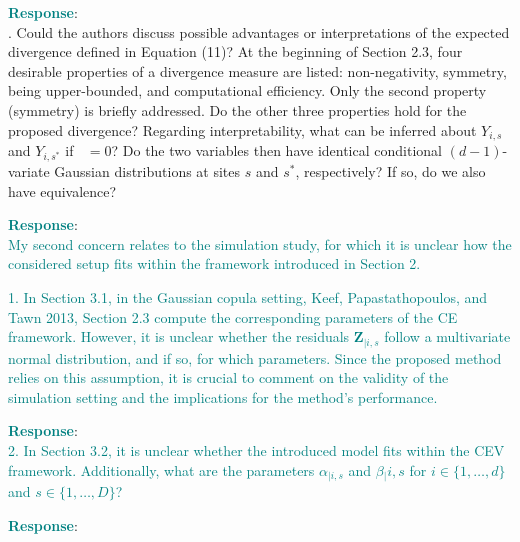 \documentclass[a4paper,12pt]{article}
\newcommand{\eJSGa}[1]{\mathop{\mathrm{eJS}_{i, #1}^{\mathrm{G}_{\lambda}}}\nolimits}
\begin{document}
\noindent \textcolor{teal}{\bf Response}: \\


{\color{teal}
. Could the authors discuss possible advantages or interpretations of the expected divergence defined in Equation (11)? 
At the beginning of Section 2.3, four desirable properties of a divergence measure are listed: non-negativity, symmetry, being upper-bounded, and computational efficiency. 
Only the second property (symmetry) is briefly addressed. 
Do the other three properties hold for the proposed divergence? 
Regarding interpretability, what can be inferred about $Y_{i,s}$ and $Y_{i,s^*}$ if
$\eJSGa{i, s, s^*} = 0$?
Do the two variables then have identical conditional $(d - 1)$-variate Gaussian distributions at
sites $s$ and $s^*$, respectively? 
If so, do we also have equivalence?
}

\noindent \textcolor{teal}{\bf Response}: \\


\noindent \textcolor{teal}{My second concern relates to the simulation study, for which it is unclear how the considered setup fits within the framework introduced in Section 2.}

\noindent \textcolor{teal}{1. In Section 3.1, in the Gaussian copula setting, Keef, Papastathopoulos, and Tawn 2013, Section 2.3 compute the corresponding parameters of the CE framework. 
However, it is unclear whether the residuals $\boldsymbol{Z}_{\mid i,s}$ follow a multivariate normal distribution, and if so, for which parameters. 
Since the proposed method relies on this assumption, it is crucial to comment on the validity of the simulation setting and the implications for the method’s performance.}

\noindent \textcolor{teal}{\bf Response}: \\


\noindent \textcolor{teal}{
2. In Section 3.2, it is unclear whether the introduced model fits within the CEV framework.
Additionally, what are the parameters $\alpha_{\mid i, s}$ and $\beta{_\mid i, s}$ for $i \in \{1, \ldots, d\}$ and $s \in \{1, \ldots, D\}$?
}

\noindent \textcolor{teal}{\bf Response}: \\
\end{document}
